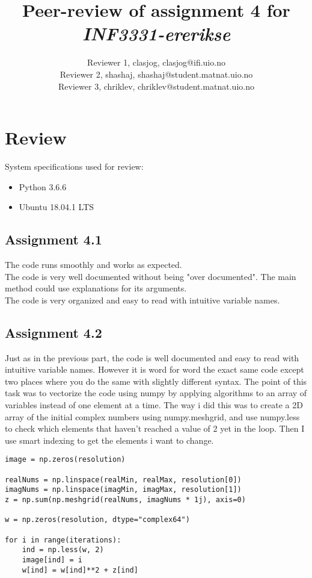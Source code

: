 \documentclass[a4paper]{article}
\title{Peer-review of assignment 4 for \textit{INF3331-ererikse}}
\author{Reviewer 1, clasjog, clasjog@ifi.uio.no \\
 		Reviewer 2, shashaj, shashaj@student.matnat.uio.no \\
		Reviewer 3, chriklev, chriklev@student.matnat.uio.no}
\begin{document}
\maketitle

\section{Review}\label{sec:review}

System specifications used for review:
\begin{itemize}
    \item Python 3.6.6
    \item Ubuntu 18.04.1 LTS
\end{itemize}

\subsection*{Assignment 4.1}
The code runs smoothly and works as expected. \\
The code is very well documented without being "over documented". The main method could use explanations for its arguments. \\
The code is very organized and easy to read with intuitive variable names. \\

\subsection*{Assignment 4.2} \label{sec:assignment5.2}
Just as in the previous part, the code is well documented and easy to read with intuitive variable names. However it is word for word the exact same code except two places where you do the same with slightly different syntax. The point of this task was to vectorize the code using numpy by applying algorithms to an array of variables instead of one element at a time. The way i did this was to create a 2D array of the initial complex numbers using numpy.meshgrid, and use numpy.less to check which elements that haven't reached a value of 2 yet in the loop. Then I use smart indexing to get the elements i want to change.

\begin{verbatim}
image = np.zeros(resolution)

realNums = np.linspace(realMin, realMax, resolution[0])
imagNums = np.linspace(imagMin, imagMax, resolution[1])
z = np.sum(np.meshgrid(realNums, imagNums * 1j), axis=0)

w = np.zeros(resolution, dtype="complex64")

for i in range(iterations):
    ind = np.less(w, 2)
    image[ind] = i
    w[ind] = w[ind]**2 + z[ind]
\end{verbatim}
\end{document}
